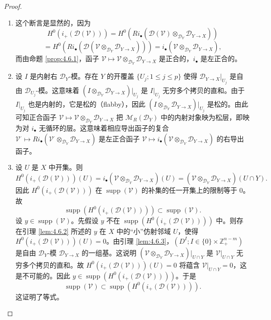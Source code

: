 \begin{proof}
\begin{enumerate}[label=(\roman*)]
  \item 这个断言是显然的，因为
    $$H^0(i_+(\mathcal{D}(\mathcal{V})))=H^0(Ri_\bullet(\mathcal{D}(\mathcal{V})\otimes_{\mathcal{D}_Y}\mathcal{D}_{Y\to X}))$$
    $$=H^0(Ri_\bullet(\mathcal{D}(\mathcal{V}\otimes_{\mathcal{D}_Y}\mathcal{D}_{Y\to X})))
    =i_\bullet(\mathcal{V}\otimes_{\mathcal{D}_Y}\mathcal{D}_{Y\to X}),$$
    而由命题 \ref{prop:4.6.1}，函子 $\mathcal{V}\mapsto\mathcal{V}\otimes_{\mathcal{D}_Y}\mathcal{D}_{Y\to X}$ 是正合的，$i_\bullet$ 是左正合的。
  \item 设 $I$ 是内射右 $\mathcal{D}_Y$-模。存在 $Y$ 的开覆盖 $\{U_j;1\le j\le p\}$ 使得
    $\mathcal{D}_{Y\to X}|_{U_j}$ 是自由 $\mathcal{D}_{U_j}$-模。这意味着
    $(I\otimes_{\mathcal{D}_Y}\mathcal{D}_{Y\to X})|_{U_j}$ 是 $I|_{U_j}$ 无穷多个拷贝的直和。由于
    $I|_{U_j}$ 也是内射的，它是松的（flabby），因此 $(I\otimes_{\mathcal{D}_Y}\mathcal{D}_{Y\to X})|_{U_j}$ 是松的。由此可知正合函子
    $\mathcal{V}\mapsto\mathcal{V}\otimes_{\mathcal{D}_Y}\mathcal{D}_{Y\to X}$ 把 $\mathcal{M}_R(\mathcal{D}_Y)$ 中的内射对象映为松层，即映为对 $i_\bullet$ 无循环的层。这意味着相应导出函子的复合
    $\mathcal{V}^\cdot\mapsto Ri_\bullet(\mathcal{V}^\cdot\otimes_{\mathcal{D}_Y}\mathcal{D}_{Y\to X})$ 是左正合函子
    $\mathcal{V}\mapsto i_\bullet(\mathcal{V}\otimes_{\mathcal{D}_Y}\mathcal{D}_{Y\to X})$ 的右导出函子。
  \item 设 $U$ 是 $X$ 中开集。则
    $$H^0(i_+(\mathcal{D}(\mathcal{V})))(U)=i_\bullet(\mathcal{V}\otimes_{\mathcal{D}_Y}\mathcal{D}_{Y\to X})(U)
    =(\mathcal{V}\otimes_{\mathcal{D}_Y}\mathcal{D}_{Y\to X})(U\cap Y).$$
    因此 $H^0(i_+(\mathcal{D}(\mathcal{V})))$ 在 $\operatorname{supp}(\mathcal{V})$ 的补集的任一开集上的限制等于 0。故
    $$\operatorname{supp}(H^0(i_+(\mathcal{D}(\mathcal{V}))))\subset\operatorname{supp}(\mathcal{V}).$$
    设 $y\in\operatorname{supp}(\mathcal{V})$。先假设 $y$ 不在 $\operatorname{supp}(H^0(i_+(\mathcal{D}(\mathcal{V}))))$ 中。则存在引理 \ref{lem:4.6.2} 所述的 $y$ 在 $X$ 中的“小”仿射邻域 $U$，使得 $H^0(i_+(\mathcal{D}(\mathcal{V})))(U)=0$。由引理 \ref{lem:4.6.3}，$(D^I;I\in\{0\}\times\mathbb{Z}_+^{n-m})$ 是自由 $\mathcal{D}_Y$-模 $\mathcal{D}_{Y\to X}$ 的一组基。这说明 $(\mathcal{V}\otimes_{\mathcal{D}_Y}\mathcal{D}_{Y\to X})|_{U\cap Y}$ 是 $\mathcal{V}|_{U\cap Y}$ 无穷多个拷贝的直和。故 $H^0(i_+(\mathcal{D}(\mathcal{V})))(U)=0$ 将蕴含 $\mathcal{V}|_{U\cap Y}=0$，这是不可能的。因此 $y\in\operatorname{supp}(H^0(i_+(\mathcal{D}(\mathcal{V}))))$。于是
    $$\operatorname{supp}(\mathcal{V})\subset\operatorname{supp}(H^0(i_+(\mathcal{D}(\mathcal{V})))).$$
    这证明了等式。
\end{enumerate}
\end{proof}

